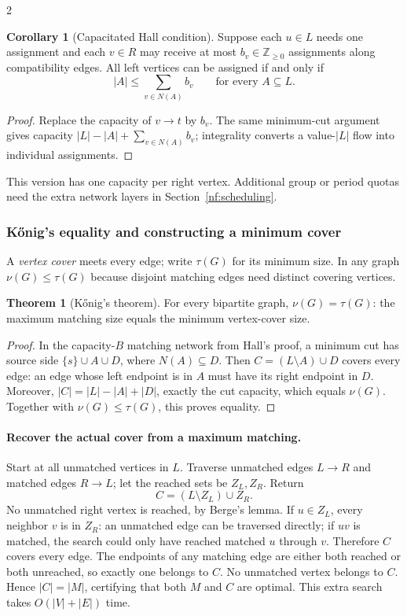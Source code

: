 \documentclass[8pt]{extarticle}
\theoremstyle{definition}
\newtheorem{theorem}[definition]{Theorem}
\newtheorem{corollary}[definition]{Corollary}
\begin{document}
\begin{multicols*}{2}
\begin{corollary}[Capacitated Hall condition]\label{nf:capacitated-hall}
Suppose each $u\in L$ needs one assignment and each $v\in R$ may receive
at most $b_v\in\mathbb Z_{\ge0}$ assignments along compatibility edges.
All left vertices can be assigned if and only if
\[
 |A|\le\sum_{v\in N(A)}b_v\qquad\text{for every }A\subseteq L.
\]
\end{corollary}
\begin{proof}
Replace the capacity of $v\to t$ by $b_v$. The same minimum-cut argument
gives capacity $|L|-|A|+\sum_{v\in N(A)}b_v$; integrality converts a
value-$|L|$ flow into individual assignments.
\end{proof}
This version has one capacity per right vertex. Additional group or period
quotas need the extra network layers in Section~\ref{nf:scheduling}.

\subsubsection*{K\H{o}nig's equality and constructing a minimum cover}
A \emph{vertex cover} meets every edge; write $\tau(G)$ for its minimum
size. In any graph $\nu(G)\le\tau(G)$ because disjoint matching edges
need distinct covering vertices.
\begin{theorem}[K\H{o}nig's theorem]\label{nf:konig}
For every bipartite graph, $\nu(G)=\tau(G)$: the maximum matching size
equals the minimum vertex-cover size.
\end{theorem}
\begin{proof}
In the capacity-$B$ matching network from Hall's proof, a minimum cut has
source side $\{s\}\cup A\cup D$, where $N(A)\subseteq D$.
Then $C=(L\setminus A)\cup D$ covers every edge: an edge whose left endpoint
is in $A$ must have its right endpoint in $D$. Moreover,
$|C|=|L|-|A|+|D|$, exactly the cut capacity, which equals $\nu(G)$.
Together with $\nu(G)\le\tau(G)$, this proves equality.
\end{proof}

\paragraph{Recover the actual cover from a maximum matching.}
Start at all unmatched vertices in $L$. Traverse unmatched edges $L\to R$
and matched edges $R\to L$; let the reached sets be $Z_L,Z_R$. Return
\[
 C=(L\setminus Z_L)\cup Z_R.
\]
No unmatched right vertex is reached, by Berge's lemma. If $u\in Z_L$,
every neighbor $v$ is in $Z_R$: an unmatched edge can be traversed directly;
if $uv$ is matched, the search could only have reached matched $u$ through
$v$. Therefore $C$ covers every edge. The endpoints of any matching edge
are either both reached or both unreached, so exactly one belongs to $C$.
No unmatched vertex belongs to $C$. Hence $|C|=|M|$, certifying that both
$M$ and $C$ are optimal. This extra search takes $O(|V|+|E|)$ time.


\end{multicols*}
\end{document}
